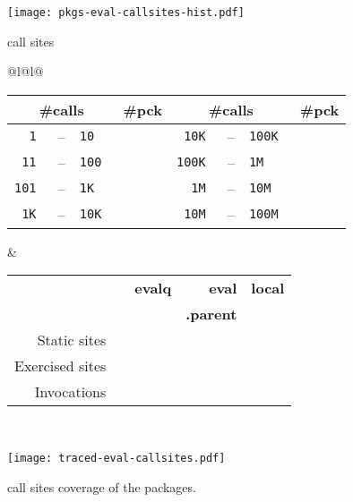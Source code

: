 \documentclass[screen,acmsmall]{acmart}%
\begin{document}
\begin{figure}[!b]
\centering
  \texttt{[image: pkgs-eval-callsites-hist.pdf]}
  \caption{ \eval call sites}\label{fig:pkgs-eval-callsites-hist}

\medskip
  \medskip

  \small
\begin{tabular}{@{}l@{\hspace{1.5cm}}l@{}}
\begin{minipage} {5cm}\small
  \begin{tabular}{r@{\,}r@{\,}l@{}r|r@{\,}r@{\,}l@{}r} \toprule
    \multicolumn{3}{c}{\bf \small\#calls} &\bf \small \#pck
&     \multicolumn{3}{c}{\bf \small\#calls} &\bf \small\#pck \\\midrule
\tt 1 &--& \tt 10      & \packageBina  & \tt 10K &--&\tt 100K  & \packageBine\\
\tt 11 &--& \tt 100    & \packageBinb  & \tt 100K &--&\tt 1M  & \packageBinf\\
\tt 101 &--& \tt 1K    & \packageBinc  & \tt 1M &--&\tt 10M   & \packageBing\\
\tt 1K &--& \tt 10K    & \packageBind  & \tt 10M &--& \tt 100M & \packageBinh\\\bottomrule
\end{tabular}
\caption{Call frequency}\label{freq}
\end{minipage}
&
\begin{minipage}{7cm}\small
\begin{tabular}{@{\,}r|rrrr}\toprule
  &\bf \eval & \bf \c{\bf evalq} & \c{\bf eval} & \c{\bf local}\\[-1.5mm]
           & & & \c{\bf .parent} &\\\midrule
\small Static sites &\packageStaticeval&\packageStaticevalq&\packageStaticevalparent&\packageStaticlocal \\
\small Exercised sites&\packageTriggeredeval&\packageTriggeredevalq&\packageTriggeredevalparent&\packageTriggeredlocal\\
\small Invocations&\packageEvalsRnd&\packageEvalqsRnd&\packageEparentsRnd&\packageLocalsRnd\\\bottomrule
\end{tabular}~\\[2mm]\caption{Variants}\label{tab:variantseval}
\end{minipage}\end{tabular}

\medskip

\texttt{[image: traced-eval-callsites.pdf]} \centering
  \caption{\eval call sites coverage of the \PkgPackages packages.}%
  \label{fig:traced-eval-callsites}
\end{figure}
\end{document}
